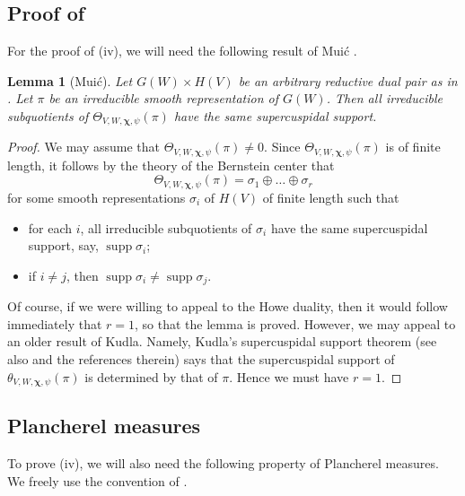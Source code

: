 \documentclass[11pt]{amsart}
\numberwithin{equation}{section}
\theoremstyle{plain}
\newtheorem{lem}[thm]{Lemma}
\theoremstyle{definition}
\theoremstyle{remark}
\def\supp{\operatorname{supp}}
\def\Chi{\boldsymbol{\chi}}
\begin{document}
\subsection{Proof of  \cite[Lemma 4.2]{muic}}

For the proof of (iv), we will need the following result of Mui\'c \cite[Lemma 4.2]{muic}.

\begin{lem}[Mui\'c]
\label{lem:theta-scsupp}
Let $G(W) \times H(V)$ be an arbitrary reductive dual pair as in \cite[\S 3]{gi}.
Let $\pi$ be an irreducible smooth representation of $G(W)$.
Then all irreducible subquotients of $\Theta_{V,W,\Chi,\psi}(\pi)$ have the same supercuspidal support.
\end{lem}

\begin{proof}
We may assume that $\Theta_{V,W,\Chi,\psi}(\pi) \ne 0$.
Since $\Theta_{V,W,\Chi,\psi}(\pi)$ is of finite length, it follows by the theory of the Bernstein center \cite{bernstein} that
\[
 \Theta_{V,W,\Chi,\psi}(\pi) = \sigma_1 \oplus \dots \oplus \sigma_r
\]
for some smooth representations $\sigma_i$ of $H(V)$ of finite length such that
\begin{itemize}
 \item for each $i$, all irreducible subquotients of $\sigma_i$ have the same supercuspidal support, say, $\supp \sigma_i$;
 \item if $i \ne j$, then $\supp \sigma_i \ne \supp \sigma_j$.
\end{itemize}
Of course, if we were willing to appeal to the Howe duality, then it would follow immediately that $r=1$, so that the lemma is proved.
However, we may appeal to an older result of Kudla.
Namely, Kudla's supercuspidal support theorem \cite{kudla} (see also \cite[Proposition 5.2]{gi} and the references therein) says that the supercuspidal support of $\theta_{V,W,\Chi,\psi}(\pi)$ is determined by that of $\pi$.
Hence we must have $r=1$.
\end{proof}

\subsection{Plancherel measures}

To prove (iv), we will also need the following property of Plancherel measures.
We freely use the convention of \cite[Appendix B]{gi}.
\end{document}
